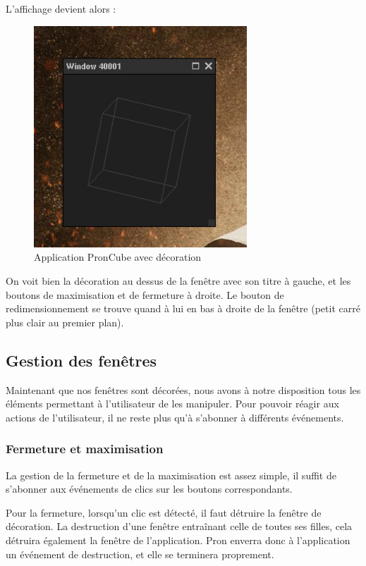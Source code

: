 L'affichage devient alors :

\begin{figure}[H]
  \centering
  \includegraphics[width=8cm]{images/pron_cube_avec_decoration.jpg}
  \caption{Application PronCube avec décoration}
  \label{fig:pron_cube_avec_decoration}
\end{figure}

On voit bien la décoration au dessus de la fenêtre avec son titre à gauche, et les boutons de maximisation et de fermeture à droite.
Le bouton de redimensionnement se trouve quand à lui en bas à droite de la fenêtre (petit carré plus clair au premier plan).

\subsection{Gestion des fenêtres}
\label{GestionFenetres}

Maintenant que nos fenêtres sont décorées, nous avons à notre disposition tous les éléments permettant à l'utilisateur de les manipuler.
Pour pouvoir réagir aux actions de l'utilisateur, il ne reste plus qu'à s'abonner à différents événements.

\subsubsection{Fermeture et maximisation}

La gestion de la fermeture et de la maximisation est assez simple, il suffit de s'abonner aux événements de clics sur les boutons correspondants.

Pour la fermeture, lorsqu'un clic est détecté, il faut détruire la fenêtre de décoration.
La destruction d'une fenêtre entraînant celle de toutes ses filles, cela détruira également la fenêtre de l'application.
Pron enverra donc à l'application un événement de destruction, et elle se terminera proprement.

